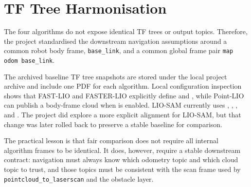 \documentclass[12pt,a4paper]{report}
\begin{document}
\begin{table}[H]
\centering
\caption{Unified interface used to connect four SLAM algorithms to the same navigation stack.}
\label{tab:unified-interface}
\setlength{\tabcolsep}{4pt}
\renewcommand{\arraystretch}{1.05}
\end{table}

\section{TF Tree Harmonisation}
The four algorithms do not expose identical TF trees or output topics. Therefore, the project standardised the downstream navigation assumptions around a common robot body frame, \texttt{base\_link}, and a common global frame pair \texttt{map \textrightarrow odom \textrightarrow base\_link}.

The archived baseline TF tree snapshots are stored under the local project archive and include one PDF for each algorithm. Local configuration inspection shows that FAST-LIO and FASTER-LIO explicitly define  and , while Point-LIO can publish a body-frame cloud when  is enabled. LIO-SAM currently uses , , , and . The project did explore a more explicit  alignment for LIO-SAM, but that change was later rolled back to preserve a stable baseline for comparison.

The practical lesson is that fair comparison does not require all internal algorithm frames to be identical. It does, however, require a stable downstream contract: navigation must always know which odometry topic and which cloud topic to trust, and those topics must be consistent with the scan frame used by \texttt{pointcloud\_to\_laserscan} and the obstacle layer.
\end{document}
